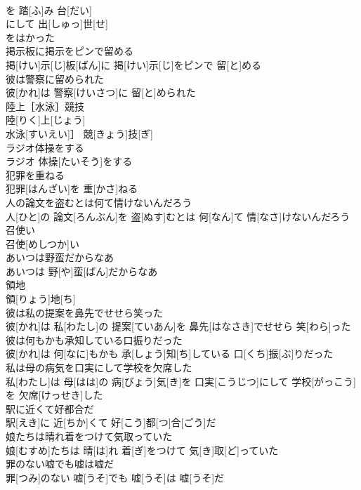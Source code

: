 \documentclass[8pt]{extreport}
\begin{document}
\begin{CJK}{UTF8}{min}
\\	を 踏[ふ]み 台[だい]
\\	にして 出[しゅっ]世[せ]
\\	をはかった
\\	掲示板に掲示をピンで留める	
\\	掲[けい]示[じ]板[ばん]に 掲[けい]示[じ]をピンで 留[と]める
\\	彼は警察に留められた	
\\	彼[かれ]は 警察[けいさつ]に 留[と]められた
\\	陸上［水泳］競技	
\\	陸[りく]上[じょう]
\\	水泳[すいえい]］ 競[きょう]技[ぎ]
\\	ラジオ体操をする	
\\	ラジオ 体操[たいそう]をする
\\	犯罪を重ねる	
\\	犯罪[はんざい]を 重[かさ]ねる
\\	人の論文を盗むとは何て情けないんだろう	
\\	人[ひと]の 論文[ろんぶん]を 盗[ぬす]むとは 何[なん]て 情[なさ]けないんだろう
\\	召使い	
\\	召使[めしつか]い
\\	あいつは野蛮だからなあ	
\\	あいつは 野[や]蛮[ばん]だからなあ
\\	領地	
\\	領[りょう]地[ち]
\\	彼は私の提案を鼻先でせせら笑った	
\\	彼[かれ]は 私[わたし]の 提案[ていあん]を 鼻先[はなさき]でせせら 笑[わら]った
\\	彼は何もかも承知している口振りだった	
\\	彼[かれ]は 何[なに]もかも 承[しょう]知[ち]している 口[くち]振[ぶ]りだった
\\	私は母の病気を口実にして学校を欠席した	
\\	私[わたし]は 母[はは]の 病[びょう]気[き]を 口実[こうじつ]にして 学校[がっこう]を 欠席[けっせき]した
\\	駅に近くて好都合だ	
\\	駅[えき]に 近[ちか]くて 好[こう]都[つ]合[ごう]だ
\\	娘たちは晴れ着をつけて気取っていた	
\\	娘[むすめ]たちは 晴[は]れ 着[ぎ]をつけて 気[き]取[ど]っていた
\\	罪のない嘘でも嘘は嘘だ	
\\	罪[つみ]のない 嘘[うそ]でも 嘘[うそ]は 嘘[うそ]だ

\end{CJK}
\end{document}
